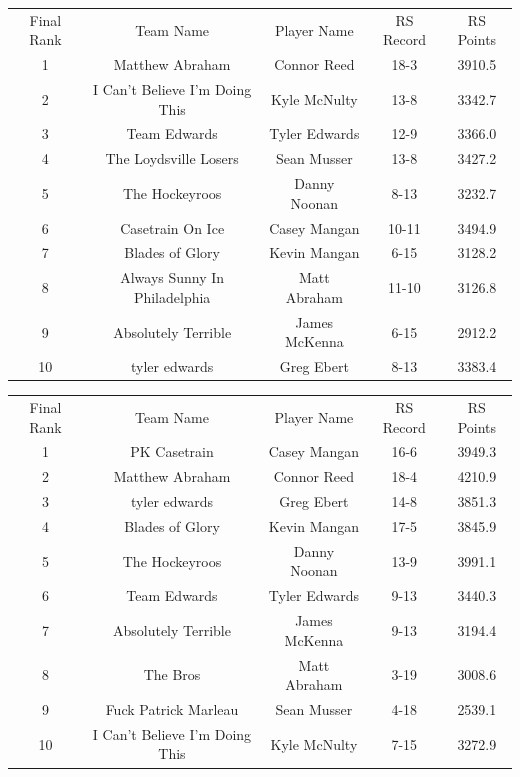 \documentclass[11pt,letterpaper]{article}
\begin{document}
\newpage
{}
\vspace{-25pt}
\begin{table} [h]
\begin{center}
\begin{tabular} { c c c c c }
\\ Final Rank & Team Name & Player Name & RS Record & RS Points
\\ 1 & Matthew Abraham & Connor Reed & 18-3 & 3910.5
\\ 2 & I Can't Believe I'm Doing This & Kyle McNulty & 13-8 & 3342.7
\\ 3 & Team Edwards & Tyler Edwards & 12-9 & 3366.0
\\ 4 & The Loydsville Losers & Sean Musser & 13-8 & 3427.2
\\ 5 & The Hockeyroos & Danny Noonan & 8-13 & 3232.7
\\ 6 & Casetrain On Ice & Casey Mangan & 10-11 & 3494.9
\\ 7 & Blades of Glory & Kevin Mangan & 6-15 & 3128.2
\\ 8 & Always Sunny In Philadelphia & Matt Abraham & 11-10 & 3126.8
\\ 9 & Absolutely Terrible & James McKenna & 6-15 & 2912.2
\\ 10 & tyler edwards & Greg Ebert & 8-13 & 3383.4
\end{tabular}
\end{center}
\end{table}

\vspace{-25pt}
\begin{table} [h]
\begin{center}
\begin{tabular} { c c c c c }
\\ Final Rank & Team Name & Player Name & RS Record & RS Points
\\ 1 & PK Casetrain & Casey Mangan & 16-6 & 3949.3
\\ 2 & Matthew Abraham & Connor Reed & 18-4 & 4210.9
\\ 3 & tyler edwards & Greg Ebert & 14-8 & 3851.3
\\ 4 & Blades of Glory & Kevin Mangan & 17-5 & 3845.9
\\ 5 & The Hockeyroos & Danny Noonan & 13-9 & 3991.1
\\ 6 & Team Edwards & Tyler Edwards & 9-13 & 3440.3
\\ 7 & Absolutely Terrible & James McKenna & 9-13 & 3194.4
\\ 8 & The Bros & Matt Abraham & 3-19 & 3008.6
\\ 9 & Fuck Patrick Marleau & Sean Musser & 4-18 & 2539.1
\\ 10 & I Can't Believe I'm Doing This & Kyle McNulty & 7-15 & 3272.9
\end{tabular}
\end{center}
\end{table}
\end{document}
